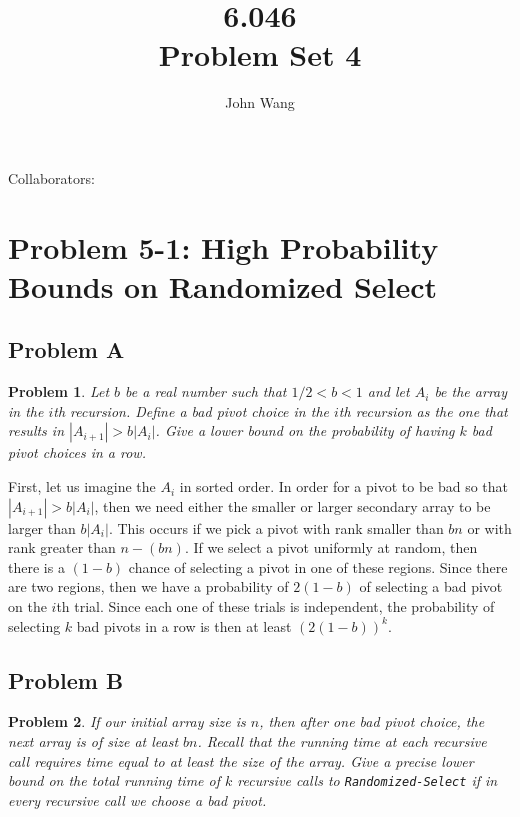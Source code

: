 \documentclass[psamsfonts]{amsart}
\title{6.046 \\
Problem Set 4}
\author{John Wang}
\newtheorem{prob}{Problem}[section]
\newenvironment{sol}{{\bfseries Solution}}{\qedsymbol}
\theoremstyle{definition}
\theoremstyle{remark}
\numberwithin{equation}{section}
\begin{document}
\maketitle

Collaborators: 

\section{Problem 5-1: High Probability Bounds on Randomized Select}

\subsection{Problem A}

\begin{prob}
Let $b$ be a real number such that $1/2 < b < 1$ and let $A_i$ be the array in the $i$th recursion. Define a bad pivot choice in the $i$th recursion as the one that results in $|A_{i+1}| > b |A_i|$. Give a lower bound on the probability of having $k$ bad pivot choices in a row.
\end{prob}

\begin{sol}
First, let us imagine the $A_i$ in sorted order. In order for a pivot to be bad so that $|A_{i+1}| > b |A_i|$, then we need either the smaller or larger secondary array to be larger than $b|A_{i}|$. This occurs if we pick a pivot with rank smaller than $bn$ or with rank greater than $n - (bn)$. If we select a pivot uniformly at random, then there is a $(1-b)$ chance of selecting a pivot in one of these regions. Since there are two regions, then we have a probability of $2(1-b)$ of selecting a bad pivot on the $i$th trial. Since each one of these trials is independent, the probability of selecting $k$ bad pivots in a row is then at least $(2(1-b))^k$. 
\end{sol}

\subsection{Problem B}

\begin{prob}
If our initial array size is $n$, then after one bad pivot choice, the next array is of size at least $bn$. Recall that the running time at each recursive call requires time equal to at least the size of the array. Give a precise lower bound on the total running time of $k$ recursive calls to \texttt{Randomized-Select} if in every recursive call we choose a bad pivot.
\end{prob}
\end{document}
